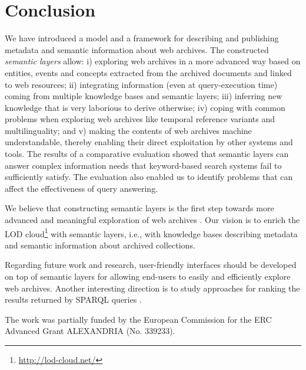 \documentclass[twocolumn]{svjour3}
\begin{document}
\section{Conclusion}
\label{sec:concl}

We have introduced a model and a framework
for describing and publishing metadata and
semantic information about web archives.
The constructed {\em semantic layers} allow:
i) exploring web archives in a more advanced way
based on entities, events and concepts extracted
from the archived documents and linked to web resources;
ii) integrating information (even at query-execution time)
coming from multiple knowledge bases and semantic layers;
iii) inferring new knowledge that is very laborious to derive otherwise;
iv) coping with common problems when exploring web archives like
temporal reference variants and multilinguality; and
v) making the contents of web archives machine understandable,
thereby enabling their direct exploitation by other systems and tools.
The results of a comparative evaluation showed that semantic layers
can answer complex information needs that keyword-based search systems
fail to sufficiently satisfy.
The evaluation also enabled us to identify problems that can
affect the effectiveness of query answering.

We believe that constructing semantic layers is
the first step towards more advanced and meaningful
exploration of web archives \cite{holzmannaccessing2017}.
Our vision is to enrich the LOD cloud\footnote{\url{http://lod-cloud.net/}}
with semantic layers, i.e., with knowledge bases describing metadata
and semantic information about archived collections.

Regarding future work and research,
user-friendly interfaces should be
developed on top of semantic layers for allowing
end-users to easily and efficiently explore web archives.
Another interesting direction is to study approaches
for ranking the results returned by SPARQL queries \cite{fafalios2017jcdlPoster}.



\begin{acknowledgements}
The work was partially funded by the
European Commission for the ERC Advanced Grant ALEXANDRIA (No. 339233).
\end{acknowledgements}




\end{document}
